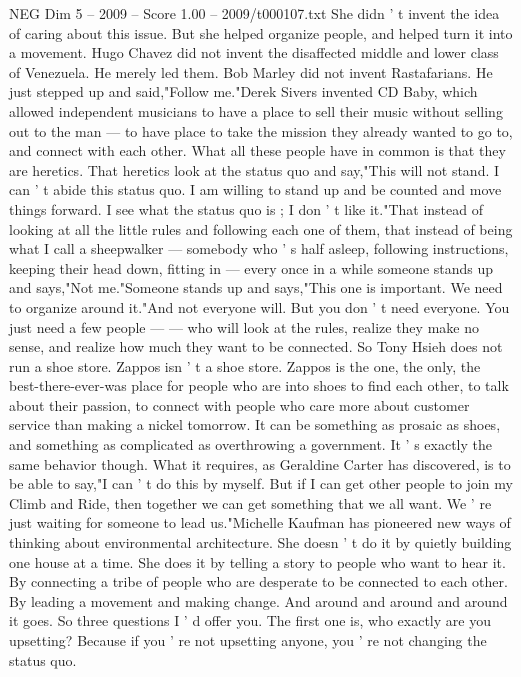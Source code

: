 \begin{textsample}{NEG Dim 5 – 2009 – Score 1.00 – 2009/t000107.txt}
She didn ' t invent the idea of caring about this issue.
But she helped organize people, and helped turn it into a movement.
Hugo Chavez did not invent the disaffected middle and lower class of Venezuela.
He merely led them.
Bob Marley did not invent Rastafarians.
He just stepped up and said,"Follow me."Derek Sivers invented CD Baby, which allowed independent musicians to have a place to sell their music without selling out to the man — to have place to take the mission they already wanted to go to, and connect with each other.
What all these people have in common is that they are heretics.
That heretics look at the status quo and say,"This will not stand.
I can ' t abide this status quo.
I am willing to stand up and be counted and move things forward.
I see what the status quo is ; I don ' t like it."That instead of looking at all the little rules and following each one of them, that instead of being what I call a sheepwalker — somebody who ' s half asleep, following instructions, keeping their head down, fitting in — every once in a while someone stands up and says,"Not me."Someone stands up and says,"This one is important.
We need to organize around it."And not everyone will.
But you don ' t need everyone.
You just need a few people — — who will look at the rules, realize they make no sense, and realize how much they want to be connected.
So Tony Hsieh does not run a shoe store.
Zappos isn ' t a shoe store.
Zappos is the one, the only, the best-there-ever-was place for people who are into shoes to find each other, to talk about their passion, to connect with people who care more about customer service than making a nickel tomorrow.
It can be something as prosaic as shoes, and something as complicated as overthrowing a government.
It ' s exactly the same behavior though.
What it requires, as Geraldine Carter has discovered, is to be able to say,"I can ' t do this by myself.
But if I can get other people to join my Climb and Ride, then together we can get something that we all want.
We ' re just waiting for someone to lead us."Michelle Kaufman has pioneered new ways of thinking about environmental architecture.
She doesn ' t do it by quietly building one house at a time.
She does it by telling a story to people who want to hear it.
By connecting a tribe of people who are desperate to be connected to each other.
By leading a movement and making change.
And around and around and around it goes.
So three questions I ' d offer you.
The first one is, who exactly are you upsetting?
Because if you ' re not upsetting anyone, you ' re not changing the status quo.

\end{textsample}
